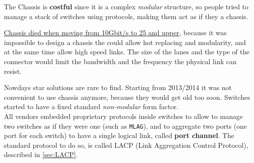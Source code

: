 The Chassis is \textbf{costful} since it is a complex \textit{modular} structure, so people tried to manage a stack of switches using protocols, making them act as if they a chassis.


\ul{Chassis died when moving from 10Gbit/s to 25 and upper}, because it was impossible to design a chassis the could allow hot replacing and modularity, and at the same time allow high speed links.
The size of the lanes and the type of the connector would limit the bandwidth and the frequency the physical link can resist.

Nowdays star solutions are rare to find. Starting from 2013/2014 it was not convenient to use chassis anymore, because they would get old too soon.
Switches started to have a fixed standard \textit{non-modular} form factor.\\
All vendors embedded proprietary protocols inside switches to allow to manage two switches as if they were one (such as \texttt{MLAG}), and to aggregate two ports (one port for each switch) to have a single logical link, called \textbf{port channel}.
The standard protocol to do so, is called LACP (Link Aggregation Control Protocol), described in \ref{sec:LACP}.

